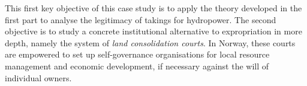 This first key objective of this case study is to apply the theory developed in the first part to analyse the legitimacy of takings for hydropower. The second objective is to study a concrete institutional alternative to expropriation in more depth, namely the system of {\it land consolidation courts}. In Norway, these courts are empowered to set up self-governance organisations for local resource management and economic development, if necessary against the will of individual owners.



